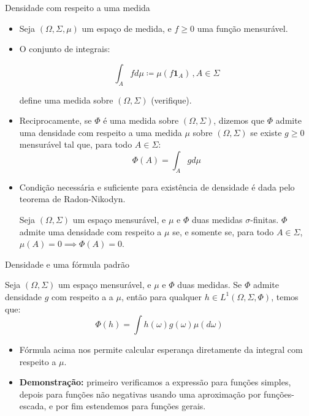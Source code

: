 \documentclass[11pt]{beamer}
\begin{document}
	\begin{frame}{Densidade com respeito a uma medida}

	\begin{itemize}
		\item 	Seja $(\Omega, \Sigma, \mu)$ um espaço de medida, e $f\geq0$ uma função mensurável.
		\item O conjunto de integrais:
		
		$$\int_{A} f d \mu \coloneqq \mu(f \mathbf{1}_{A})\, , A \in \Sigma$$
		
		define uma medida sobre $(\Omega, \Sigma)$ (verifique).
		\item Reciprocamente, se $\Phi$ é uma medida sobre $(\Omega,\Sigma)$, dizemos que $\Phi$ admite uma densidade com respeito a uma medida $\mu$ sobre $(\Omega,\Sigma)$ se existe $g \geq 0$ mensurável tal que, para todo $A \in \Sigma$:
		$$\Phi(A) = \int_{A} g d \mu$$
		\item Condição necessária e suficiente para existência de densidade é dada pelo teorema de Radon-Nikodyn.
		\begin{theorem}
			Seja $(\Omega,\Sigma)$ um espaço mensurável, e $\mu$ e $\Phi$ duas medidas {\color{red}$\sigma$-finitas}. $\Phi$ admite uma densidade com respeito a $\mu$ se, e somente se, para todo $A \in \Sigma$, $\mu(A) = 0 \implies \Phi(A) = 0$.
		\end{theorem}
	\end{itemize}

	\end{frame}
	\begin{frame}{Densidade e uma fórmula padrão}
		\begin{lemma}
			Seja $(\Omega,\Sigma)$ um espaço mensurável, e $\mu$ e $\Phi$ duas medidas.  Se $\Phi$ admite densidade $g$ com respeito a a $\mu$, então para qualquer $h \in L^1(\Omega, \Sigma, \Phi)$, temos que:
			$$\Phi(h) = \int h(\omega) g(\omega) \mu(d\omega)$$
		\end{lemma}
		\begin{itemize}
			\item Fórmula acima nos permite calcular esperança diretamente da integral com respeito a $\mu$.
			\item \textbf{Demonstração:} primeiro verificamos  a expressão para funções simples, depois para funções não negativas usando uma aproximação por funções-escada, e por fim estendemos para funções gerais.
		\end{itemize}
	\end{frame}
\end{document}
